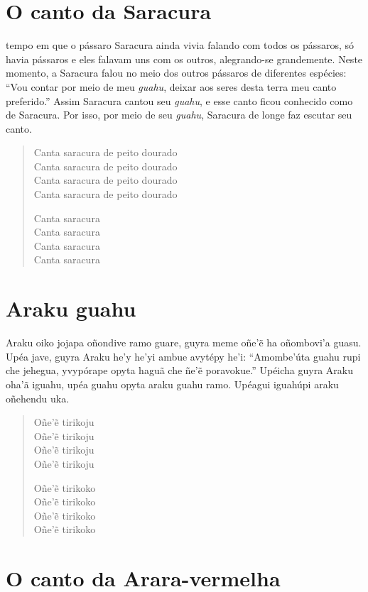 \chapter{O canto da Saracura}

 tempo em que o pássaro Saracura ainda vivia falando com todos os
pássaros, só havia pássaros e eles falavam uns com os outros,
alegrando-se grandemente. Neste momento, a Saracura falou no meio dos
outros pássaros de diferentes espécies: ``Vou contar por meio de meu
\textit{guahu}, deixar aos seres desta terra meu canto preferido.'' Assim
Saracura cantou seu \textit{guahu}, e esse canto ficou conhecido como de
Saracura. Por isso, por meio de seu \textit{guahu}, Saracura de longe faz
escutar seu canto.

\begin{verse}
Canta saracura de peito dourado\\
Canta saracura de peito dourado\\
Canta saracura de peito dourado\\
Canta saracura de peito dourado

Canta saracura\\
Canta saracura\\
Canta saracura\\
Canta saracura
\end{verse}

\chapter{Araku guahu}

 Araku oiko jojapa oñondive ramo guare, guyra meme oñe'ẽ ha
oñombovi'a guasu. Upéa jave, guyra Araku he'y he'yi ambue avytépy he'i:
``Amombe'úta guahu rupi che jehegua, yvypórape opyta haguã che ñe'ẽ
poravokue.'' Upéicha guyra Araku oha'ã iguahu, upéa guahu opyta araku
guahu ramo. Upéagui iguahúpi araku oñehendu uka.

\begin{verse}
Oñe'ẽ tirikoju\\
Oñe'ẽ tirikoju\\
Oñe'ẽ tirikoju\\
Oñe'ẽ tirikoju

Oñe'ẽ tirikoko\\
Oñe'ẽ tirikoko\\
Oñe'ẽ tirikoko\\
Oñe'ẽ tirikoko
\end{verse}

\chapter{O canto da Arara-vermelha}

